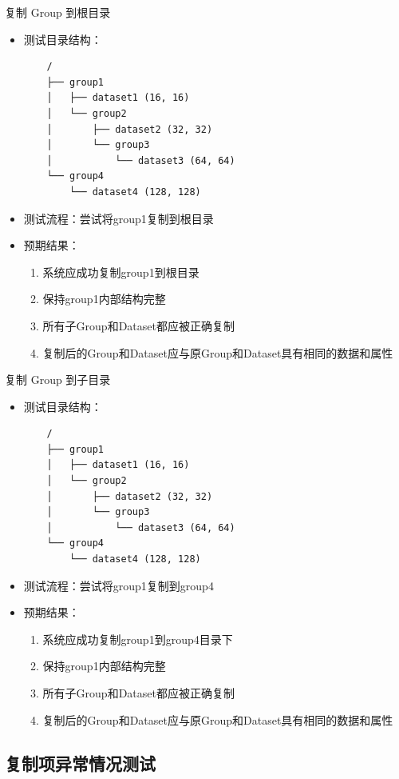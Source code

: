 \documentclass[a4paper,12pt]{report}	%
\begin{document}
复制 Group 到根目录
\begin{itemize}
    \item 测试目录结构：
    \begin{verbatim}
    /
    ├── group1
    │   ├── dataset1 (16, 16)
    │   └── group2
    │       ├── dataset2 (32, 32)
    │       └── group3
    │           └── dataset3 (64, 64)
    └── group4
        └── dataset4 (128, 128)
    \end{verbatim}
    \item 测试流程：尝试将group1复制到根目录
    \item 预期结果：
    \begin{enumerate}
        \item 系统应成功复制group1到根目录
        \item 保持group1内部结构完整
        \item 所有子Group和Dataset都应被正确复制
        \item 复制后的Group和Dataset应与原Group和Dataset具有相同的数据和属性
    \end{enumerate}
\end{itemize}

复制 Group 到子目录
\begin{itemize}
    \item 测试目录结构：
    \begin{verbatim}
    /
    ├── group1
    │   ├── dataset1 (16, 16)
    │   └── group2
    │       ├── dataset2 (32, 32)
    │       └── group3
    │           └── dataset3 (64, 64)
    └── group4
        └── dataset4 (128, 128)
    \end{verbatim}
    \item 测试流程：尝试将group1复制到group4
    \item 预期结果：
    \begin{enumerate}
        \item 系统应成功复制group1到group4目录下
        \item 保持group1内部结构完整
        \item 所有子Group和Dataset都应被正确复制
        \item 复制后的Group和Dataset应与原Group和Dataset具有相同的数据和属性
    \end{enumerate}
\end{itemize}

\subsection{复制项异常情况测试}
\end{document}
